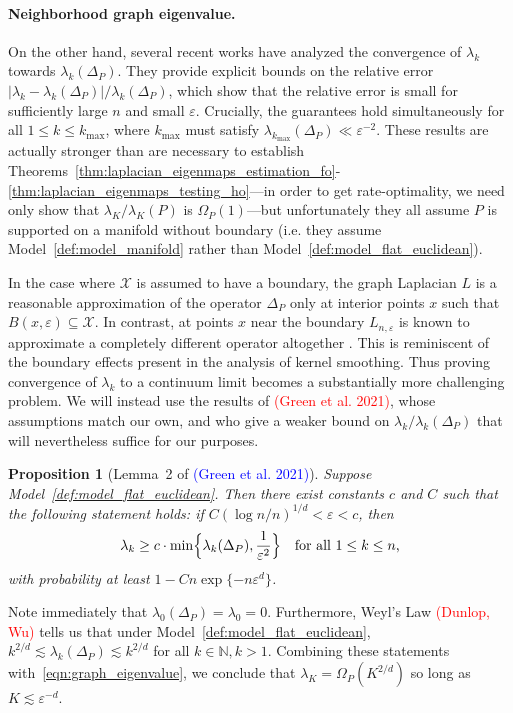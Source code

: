 \documentclass{article}
\newcommand{\1}{\mathbf{1}}
\newcommand{\mc}[1]{\mathcal{#1}}
\theoremstyle{alden}
\theoremstyle{aldenthm}
\newtheorem{proposition}{Proposition}
\theoremstyle{definition}
\theoremstyle{remark}
\begin{document}
\paragraph{Neighborhood graph eigenvalue.}
On the other hand, several recent works \citep{burago2014,garciatrillos18,calder2019} have analyzed the convergence of $\lambda_{k}$ towards $\lambda_{k}(\Delta_P)$. They provide explicit bounds on the relative error $|\lambda_{k} - \lambda_{k}(\Delta_P)|/\lambda_{k}(\Delta_P)$, which show that the relative error is small for sufficiently large $n$ and small $\varepsilon$. Crucially, the guarantees hold simultaneously for all $1 \leq k \leq k_{\max}$, where $k_{\max}$ must satisfy $\lambda_{k_{\max}}(\Delta_P) \ll \varepsilon^{-2}$. These results are actually stronger than are necessary to establish Theorems~\ref{thm:laplacian_eigenmaps_estimation_fo}-\ref{thm:laplacian_eigenmaps_testing_ho}---in order to get rate-optimality, we need only show that $\lambda_{K}/\lambda_K(P)$ is $\Omega_P(1)$---but unfortunately they all assume $P$ is supported on a manifold without boundary (i.e. they assume Model~\ref{def:model_manifold} rather than Model~\ref{def:model_flat_euclidean}). 

In the case where $\mc{X}$ is assumed to have a boundary, the graph Laplacian $L$ is a reasonable approximation of the operator $\Delta_P$ only at interior points $x$ such that $B(x,\varepsilon) \subseteq \mc{X}$. In contrast, at points $x$ near the boundary $L_{n,\varepsilon}$ is known to approximate a completely different operator altogether \citep{belkin2012}. This is reminiscent of the boundary effects present in the analysis of kernel smoothing. Thus proving convergence of $\lambda_k$ to a continuum limit becomes a substantially more challenging problem.  We will instead use the results of \textcolor{red}{(Green et al. 2021)}, whose assumptions match our own, and who give a weaker bound on $\lambda_k/\lambda_k(\Delta_P)$ that will nevertheless suffice for our purposes. 

\begin{proposition}[Lemma~2 of \textcolor{blue}{(Green et al. 2021)}]
	\label{prop:graph_eigenvalue}
	Suppose Model~\ref{def:model_flat_euclidean}. Then there exist constants $c$ and $C$ such that the following statement holds: if $C(\log n/n)^{1/d} < \varepsilon < c$, then
	\begin{equation}
	\label{eqn:graph_eigenvalue}
	\lambda_k \geq c \cdot \min\Bigl\{\lambda_k(\Delta_P), \frac{1}{\varepsilon^{2}} \Bigr\} \quad \textrm{for all $1 \leq k \leq n$,}
	\end{equation}
	with probability at least $1 - Cn\exp\{-n\varepsilon^d\}$. 
\end{proposition}
Note immediately that $\lambda_0(\Delta_P) = \lambda_0 = 0$. Furthermore, Weyl's Law \textcolor{red}{(Dunlop, Wu)} tells us that under Model~\ref{def:model_flat_euclidean}, $k^{2/d} \lesssim \lambda_{k}(\Delta_P) \lesssim k^{2/d}$ for all $k \in \mathbb{N}, k > 1$. Combining these statements with~\eqref{eqn:graph_eigenvalue}, we conclude that $\lambda_{K} = \Omega_P(K^{2/d})$ so long as $K \lesssim \varepsilon^{-d}$. 
\end{document}
